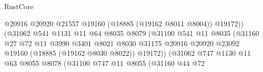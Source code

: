 \begin{lexlean}{RustCore}
\begin{coremodule}
                                                  @20916
                                                  @20920
                                                  @21557
                                                  @19160
                                                  (@18885 (@19162 @8011 @8004))
                                                  @19172))
                                              (@31062
                                                @541
                                                @1131
                                                @11
                                                @64
                                                @8035
                                                @8079
                                                (@31100
                                                  @541
                                                  @11
                                                  @8035
                                                  (@31160
                                                    @27
                                                    @72
                                                    @11
                                                    @3990
                                                    @3401
                                                    @8021
                                                    @8030
                                                    @31175
                                                    @20916
                                                    @20920
                                                    @23092
                                                    @19160
                                                    (@18885 (@19162 @8030 @8022))
                                                    @19172))
                                                (@31062
                                                  @747
                                                  @1130
                                                  @11
                                                  @63
                                                  @8055
                                                  @8078
                                                  (@31100
                                                    @747
                                                    @11
                                                    @8055
                                                    (@31160
                                                      @44
                                                      @72

\end{coremodule}
\end{lexlean}

